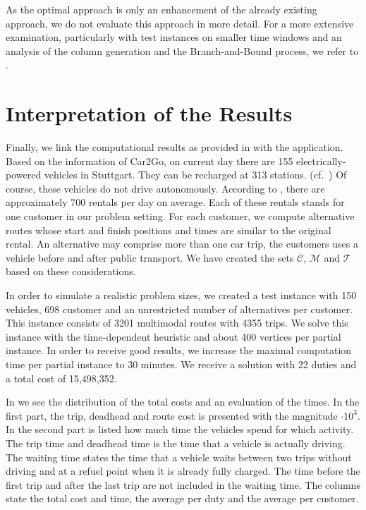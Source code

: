 As the optimal approach is only an enhancement of the already existing approach, we do not evaluate this approach in more detail. For a more extensive examination, particularly with test instances on smaller time windows and an analysis of the column generation and the Branch-and-Bound process, we refer to \cite[Sec.~10.2]{Kaiser}. 


\section{Interpretation of the Results}

Finally, we link the computational results as provided in  with the application. Based on the information of Car2Go, on current day there are 155 electrically-powered vehicles in Stuttgart. They can be recharged at 313 stations. (cf.~\cite[p.~144]{Kaiser}) Of course, these vehicles do not drive autonomously. According to , there are approximately 700 rentals per day on average. Each of these rentals stands for one customer in our problem setting. For each customer, we compute alternative routes whose start and finish positions and times are similar to the original rental. An alternative may comprise more than one car trip, \ie the customers uses a vehicle before and after public transport. We have created the sets $\mathcal{C}$, $\mathcal{M}$ and $\mathcal{T}$ based on these considerations.

In order to simulate a realistic problem sizes, we created a test instance with 150 vehicles, 698 customer and an unrestricted number of alternatives per customer. This instance consists of 3201 multimodal routes with 4355 trips. We solve this instance with the time-dependent heuristic and about 400 vertices per partial instance. In order to receive good results, we increase the maximal computation time per partial instance to 30 minutes. We receive a solution with 22 duties and a total cost of 15,498,352.

In  we see the distribution of the total costs and an evaluation of the times. In the first part, the trip, deadhead and route cost is presented with the magnitude ${\cdot 10^3}$. In the second part is listed how much time the vehicles spend for which activity. The trip time and deadhead time is the time that a vehicle is actually driving. The waiting time states the time that a vehicle waits between two trips without driving and at a refuel point when it is already fully charged. The time before the first trip and after the last trip are not included in the waiting time. The columns state the total cost and time, the average per duty and the average per customer. 

